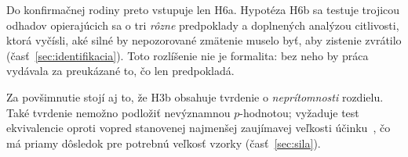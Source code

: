 Do konfirmačnej rodiny preto vstupuje len H6a. Hypotéza H6b sa testuje trojicou odhadov opierajúcich sa o tri \emph{rôzne} predpoklady a doplnených analýzou citlivosti, ktorá vyčísli, aké silné by nepozorované zmätenie muselo byť, aby zistenie zvrátilo (časť~\ref{sec:identifikacia}). Toto rozlíšenie nie je formalita: bez neho by práca vydávala za preukázané to, čo len predpokladá.

Za povšimnutie stojí aj to, že H3b obsahuje tvrdenie o \emph{neprítomnosti} rozdielu. Také tvrdenie nemožno podložiť nevýznamnou $p$-hodnotou; vyžaduje test ekvivalencie oproti vopred stanovenej najmenšej zaujímavej veľkosti účinku~\cite{lakens2017tost,lakens2018equivalence}, čo má priamy dôsledok pre potrebnú veľkosť vzorky (časť~\ref{sec:sila}).
